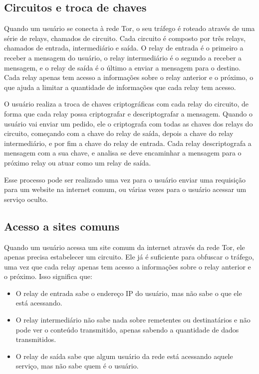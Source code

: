 \subsection{Circuitos e troca de chaves}

Quando um usuário se conecta à rede Tor, o seu tráfego é roteado através de uma série de relays, chamados de circuito. Cada circuito é composto por três relays, chamados de entrada, intermediário e saída. O relay de entrada é o primeiro a receber a mensagem do usuário, o relay intermediário é o segundo a receber a mensagem, e o relay de saída é o último a enviar a mensagem para o destino. Cada relay apenas tem acesso a informações sobre o relay anterior e o próximo, o que ajuda a limitar a quantidade de informações que cada relay tem acesso.

O usuário realiza a troca de chaves criptográficas com cada relay do circuito, de forma que cada relay possa criptografar e descriptografar a mensagem. Quando o usuário vai enviar um pedido, ele o criptografa com todas as chaves dos relays do circuito, começando com a chave do relay de saída, depois a chave do relay intermediário, e por fim a chave do relay de entrada. Cada relay descriptografa a mensagem com a sua chave, e analisa se deve encaminhar a mensagem para o próximo relay ou atuar como um relay de saída.

Esse processo pode ser realizado uma vez para o usuário enviar uma requisição para um website na internet comum, ou várias vezes para o usuário acessar um serviço oculto.

\subsection{Acesso a sites comuns}

Quando um usuário acessa um site comum da internet através da rede Tor, ele apenas precisa estabelecer um circuito. Ele já é suficiente para obfuscar o tráfego, uma vez que cada relay apenas tem acesso a informações sobre o relay anterior e o próximo. Isso significa que:

\begin{itemize}
    \item O relay de entrada sabe o endereço IP do usuário, mas não sabe o que ele está acessando.
    \item O relay intermediário não sabe nada sobre remetentes ou destinatários e não pode ver o conteúdo transmitido, apenas sabendo a quantidade de dados transmitidos.
    \item O relay de saída sabe que algum usuário da rede está acessando aquele serviço, mas não sabe quem é o usuário.
\end{itemize}


